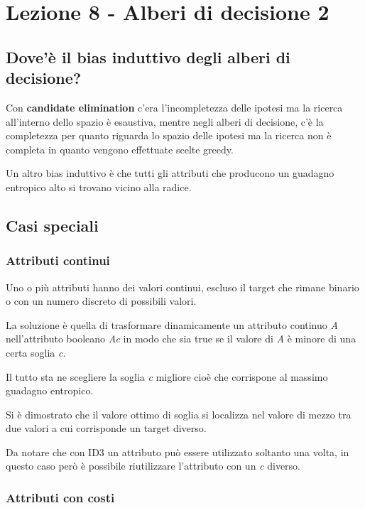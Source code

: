 \section{Lezione 8 - Alberi di decisione
2}\label{lezione-8---alberi-di-decisione-2}

\subsection{Dove'è il bias induttivo degli alberi di
decisione?}\label{doveuxe8-il-bias-induttivo-degli-alberi-di-decisione}

Con \textbf{candidate elimination} c'era l'incompletezza delle ipotesi
ma la ricerca all'interno dello spazio è esaustiva, mentre negli alberi
di decisione, c'è la completezza per quanto riguarda lo spazio delle
ipotesi ma la ricerca non è completa in quanto vengono effettuate scelte
greedy.

Un altro bias induttivo è che tutti gli attributi che producono un
guadagno entropico alto si trovano vicino alla radice.

\subsection{Casi speciali}\label{casi-speciali}

\subsubsection{Attributi continui}\label{attributi-continui}

Uno o più attributi hanno dei valori continui, escluso il target che
rimane binario o con un numero discreto di possibili valori.

La soluzione è quella di trasformare dinamicamente un attributo continuo
\emph{A} nell'attributo booleano \emph{Ac} in modo che sia true se il
valore di \emph{A} è minore di una certa soglia \emph{c}.

Il tutto sta ne scegliere la soglia \emph{c} migliore cioè che
corrispone al massimo guadagno entropico.

Si è dimostrato che il valore ottimo di soglia si localizza nel valore
di mezzo tra due valori a cui corrisponde un target diverso.

Da notare che con ID3 un attributo può essere utilizzato soltanto una
volta, in questo caso però è possibile riutilizzare l'attributo con un
\emph{c} diverso.

\subsubsection{Attributi con costi}\label{attributi-con-costi}

